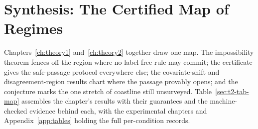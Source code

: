 \section{Synthesis: The Certified Map of Regimes}
\label{sec:t2-synthesis}

Chapters~\ref{ch:theory1} and~\ref{ch:theory2} together draw one map. The
impossibility theorem fences off the region where no label-free rule may commit; the
certificate gives the safe-passage protocol everywhere else; the covariate-shift and
disagreement-region results chart where the passage provably opens; and the conjecture
marks the one stretch of coastline still unsurveyed. Table~\ref{sec:t2-tab-map}
assembles the chapter's results with their guarantees and the machine-checked evidence
behind each, with the experimental chapters and Appendix~\ref{app:tables} holding the
full per-condition records.

